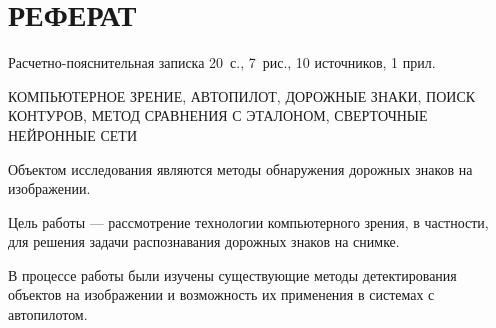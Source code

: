 \chapter*{РЕФЕРАТ}

Расчетно-пояснительная записка 20~с., 7~рис., 10 источников, 1 прил.
\begin{sloppypar}
\MakeUppercase{компьютерное зрение, автопилот, дорожные знаки, поиск контуров, метод сравнения с эталоном, сверточные нейронные сети}
\end{sloppypar}

Объектом исследования являются методы обнаружения дорожных знаков на изображении.

Цель работы — рассмотрение технологии компьютерного зрения, в частности, для решения задачи
распознавания дорожных знаков на снимке.

В процессе работы были изучены существующие методы детектирования объектов на изображении и возможность их применения в системах с автопилотом.

\setcounter{page}{3}